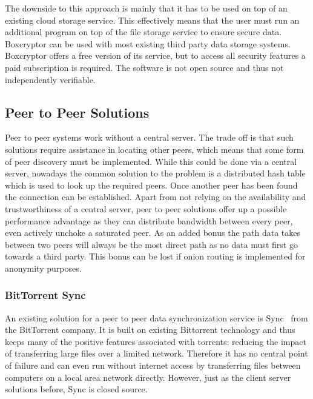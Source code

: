 The downside to this approach is mainly that it has to be used on top of an existing cloud storage service.
This effectively means that the user must run an additional program on top of the file storage service to ensure secure data.
Boxcryptor can be used with most existing third party data storage systems.
Boxcryptor offers a free version of its service, but to access all security features a paid subscription is required.
The software is not open source and thus not independently verifiable.

\subsection{Peer to Peer Solutions}

Peer to peer systems work without a central server.
The trade off is that such solutions require assistance in locating other peers, which means that some form of peer discovery must be implemented.
While this could be done via a central server, nowadays the common solution to the problem is a distributed hash table~\cite{ratnasamy2001scalable} which is used to look up the required peers.
Once another peer has been found the connection can be established.
Apart from not relying on the availability and trustworthiness of a central server, peer to peer solutions offer up a possible performance advantage as they can distribute bandwidth between every peer, even actively unchoke a saturated peer.
As an added bonus the path data takes between two peers will always be the most direct path as no data must first go towards a third party.
This bonus can be lost if onion routing is implemented for anonymity purposes.

\subsubsection{BitTorrent Sync}
\label{subs:BitTorrent Sync}

An existing solution for a peer to peer data synchronization service is Sync~\cite{web:site:bittorrent_sync} from the BitTorrent company.
It is built on existing Bittorrent technology and thus keeps many of the positive features associated with torrents: reducing the impact of transferring large files over a limited network.
Therefore it has no central point of failure and can even run without internet access by transferring files between computers on a local area network directly.
However, just as the client server solutions before, Sync is closed source.

